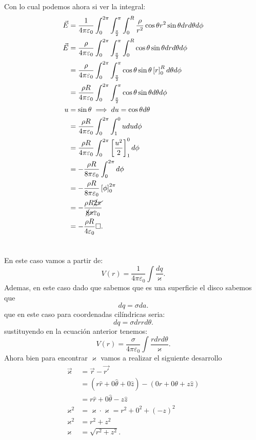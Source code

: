 \documentclass{report}
\begin{document}
Con lo cual podemos ahora si ver la integral:
\begin{align*}
  \vec{E} &= \frac{1}{4\pi\varepsilon_0}\int_{0}^{2\pi} \int_{\frac{\pi}{2}}^{\pi} \int_{0}^{R} \frac{\rho}{r^2}\cos\theta r^2 \sin\theta dr d\theta d\phi\\
  \vec{E} &= \frac{\rho}{4\pi\varepsilon_0}\int_{0}^{2\pi} \int_{\frac{\pi}{2}}^{\pi} \int_{0}^{R} \cos\theta \sin\theta dr d\theta d\phi\\
  &= \frac{\rho}{4\pi\varepsilon_0} \int_{0}^{2\pi} \int_{\frac{\pi}{2}}^{\pi} \cos\theta \sin\theta \left[ r \right]_{0}^{R} d\theta d\phi \\
  &= \frac{\rho R}{4\pi\varepsilon_0} \int_{0}^{2\pi} \int_{\frac{\pi}{2}}^{\pi} \cos\theta \sin\theta d\theta d\phi \\
  u &= \sin\theta \implies du = \cos\theta d\theta \\
  &= \frac{\rho R}{4\pi\varepsilon_0} \int_{0}^{2\pi} \int_{1}^{0} u du d\phi \\
  &= \frac{\rho R}{4\pi\varepsilon_0} \int_{0}^{2\pi} \left[ \frac{u^2}{2} \right]_{1}^{0} d\phi \\
  &= -\frac{\rho R}{8\pi\varepsilon_0}\int_{0}^{2\pi} d\phi \\
  &= -\frac{\rho R}{8\pi\varepsilon_0}\left[ \phi \right]_{0}^{2\pi} \\
  &= -\frac{\rho R \cancel{2}\cancel{\pi}}{\cancel{8}\cancel{\pi}\varepsilon_0} \\
  &= - \frac{\rho R}{4\varepsilon_0} \square
.\end{align*}

\chapter{}

En este caso vamos a partir de: \[
V\left( r \right) = \frac{1}{4\pi\varepsilon_0}\int \frac{dq}{\varkappa}
.\] Ademas, en este caso dado que sabemos que es una superficie el disco sabemos que \[
dq = \sigma da
.\] que en este caso para coordenadas cilíndricas seria: \[
dq = \sigma dr r d\theta
.\] sustituyendo en la ecuación anterior tenemos: \[
V\left( r \right) = \frac{\sigma}{4\pi\varepsilon_0}\int \frac{r dr d\theta}{\varkappa}
.\] Ahora bien para encontrar $\varkappa$ vamos a realizar el siguiente desarrollo
 \begin{align*}
   \vec{\varkappa} &= \vec{r} - \vec{r'}\\
   &= \left( r \hat{r} + 0 \hat{\theta} + 0 \hat{z} \right) - \left( 0 \hat{r} + 0 \theta + z \hat{z} \right)  \\
   &= r \hat{r} + 0 \hat{\theta} - z\hat{z} \\
   \varkappa^2 &= \varkappa \cdot  \varkappa = r^2 + 0^2 + \left( -z \right) ^2 \\
   \varkappa^2 &= r^2 + z^2 \\
   \varkappa &= \sqrt{r^2 + z^2}
.\end{align*}
\end{document}
